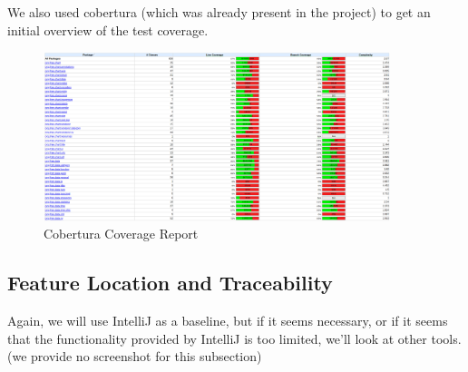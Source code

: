 \documentclass{article}
\begin{document}
We also used cobertura (which was already present in the project) to get an initial overview of the test coverage.

\begin{figure}[H]
\centering
	\includegraphics[width=0.9\textwidth]{cobertura_coverage.png}
	\caption{Cobertura Coverage Report}
\end{figure}

\subsection{Feature Location and Traceability}

Again, we will use IntelliJ as a baseline, but if it seems necessary, or if it seems that the functionality provided by IntelliJ is too limited, we'll look at other tools.\\

\noindent
(we provide no screenshot for this subsection)
\end{document}
